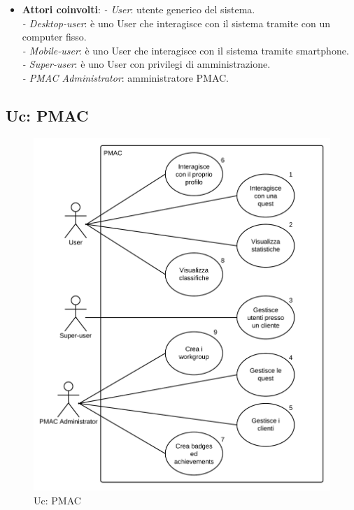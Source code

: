 {\begin{itemize}

\item \textbf{Attori coinvolti}:
\emph{- User}: utente generico del sistema.\\
\emph{- Desktop-user}: è uno User che interagisce con il sistema tramite con un computer fisso.\\
\emph{- Mobile-user}: è uno User che interagisce con il sistema tramite smartphone.\\
\emph{- Super-user}: è uno User con privilegi di amministrazione.\\
\emph{- PMAC Administrator}: amministratore PMAC.
\end{itemize}

\newpage

\subsection{Uc: PMAC}
\begin{figure}[ht]
\centering
\caption{Uc: PMAC}
\includegraphics[scale=0.69]{images/cap1/UseCase/UcPMAC} %
\end{figure}

}
